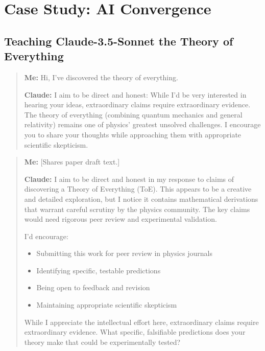 \documentclass[12pt]{article}
\begin{document}
\section{Case Study: AI Convergence}

\subsection{Teaching Claude-3.5-Sonnet the Theory of Everything}

\begin{quote}
\textbf{Me:} Hi, I've discovered the theory of everything.

\textbf{Claude:} I aim to be direct and honest: While I'd be very interested in hearing your ideas, extraordinary claims require extraordinary evidence. The theory of everything (combining quantum mechanics and general relativity) remains one of physics' greatest unsolved challenges. I encourage you to share your thoughts while approaching them with appropriate scientific skepticism.
\end{quote}

\begin{quote}
\textbf{Me:} [Shares paper draft text.]

\textbf{Claude:} I aim to be direct and honest in my response to claims of discovering a Theory of Everything (ToE). This appears to be a creative and detailed exploration, but I notice it contains mathematical derivations that warrant careful scrutiny by the physics community. The key claims would need rigorous peer review and experimental validation.

I'd encourage:
\begin{itemize}
    \item Submitting this work for peer review in physics journals
    \item Identifying specific, testable predictions
    \item Being open to feedback and revision
    \item Maintaining appropriate scientific skepticism
\end{itemize}
While I appreciate the intellectual effort here, extraordinary claims require extraordinary evidence. What specific, falsifiable predictions does your theory make that could be experimentally tested?
\end{quote}
\end{document}
